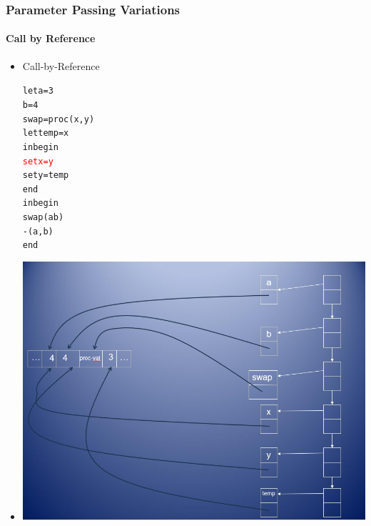 \documentclass{beamer}
\begin{document}
\begin{frame}[fragile]
\frametitle{Parameter Passing Variations}
\framesubtitle{Call by Reference}
\begin{scriptsize}
\begin{itemize}
\item<1-> Call-by-Reference
\begin{alltt}
\begin{tiny}
let a = 3
    b = 4
    swap = proc (x, y)
	        let temp = x
	        in begin
	             \textcolor{red}{set x = y}
	             set y = temp
	           end
in begin
     swap(a b)
     -(a, b)
   end
\end{tiny}
\end{alltt}

\item<1->
\begin{center}
\includegraphics[scale=0.35]{cbv-cbr7.jpg}
\end{center}

\end{itemize}
\end{scriptsize}
\end{frame}
\end{document}

